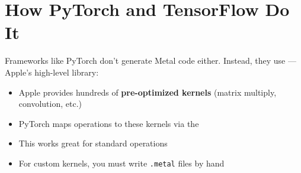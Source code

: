 \section{How PyTorch and TensorFlow Do It}

Frameworks like PyTorch don't generate Metal code either. Instead, they use \textbf{}\cite{pytorchmps}\cite{applepytorch}—Apple's high-level library:

\begin{itemize}[noitemsep]
  \item Apple provides hundreds of \textbf{pre-optimized  kernels} (matrix multiply, convolution, etc.)\cite{metaldocs}
  \item PyTorch maps operations to these kernels via the \textbf{ }
  \item This works great for standard  operations
  \item For custom kernels, you must write \texttt{.metal} files by hand\cite{metalspec}
\end{itemize}

